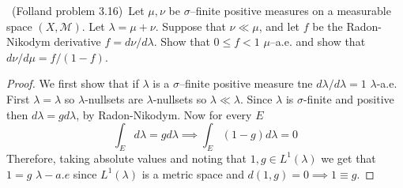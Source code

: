 \documentclass[11pt]{amsart}
\theoremstyle{definition}
\numberwithin{theorem}{section}
\numberwithin{definition}{section}
\numberwithin{equation}{section}
\def\scriptm{{\mathcal M}}
\begin{document}
\medskip {}\ (Folland problem 3.16)\ 
Let $\mu,\nu$ be $\sigma$--finite positive measures on a measurable space $(X,\scriptm)$.
Let $\lambda = \mu+\nu$.
Suppose that $\nu\ll\mu$, and let $f$ be the Radon-Nikodym derivative
$f = d\nu/d\lambda$.
Show that $0\le f<1$ $\mu$--a.e. 
and show that $d\nu/d\mu =f/(1-f)$.
\begin{proof}
	We first show that if $\lambda$ is a $\sigma$--finite positive measure tne $d\lambda/d\lambda = 1$ $\lambda$-a.e. First
	$\lambda = \lambda$ so $\lambda$-nullsets are $\lambda$-nullsets so $\lambda \ll \lambda$. Since $\lambda$ is $\sigma$-finite and positive then $d \lambda = g d \lambda$, by Radon-Nikodym. Now for every $E$
	\begin{equation*}
		\int_E d\lambda = g d\lambda \implies \int_E (1 - g) d\lambda = 0
	\end{equation*}
	Therefore, taking absolute values and noting that $1, g \in L^1(\lambda)$ we get that $1 = g$ $\lambda-a.e$ 
	since $L^1(\lambda)$ is a metric space and $d(1, g) = 0 \implies 1 \equiv g.$


\end{proof}
\end{document}
